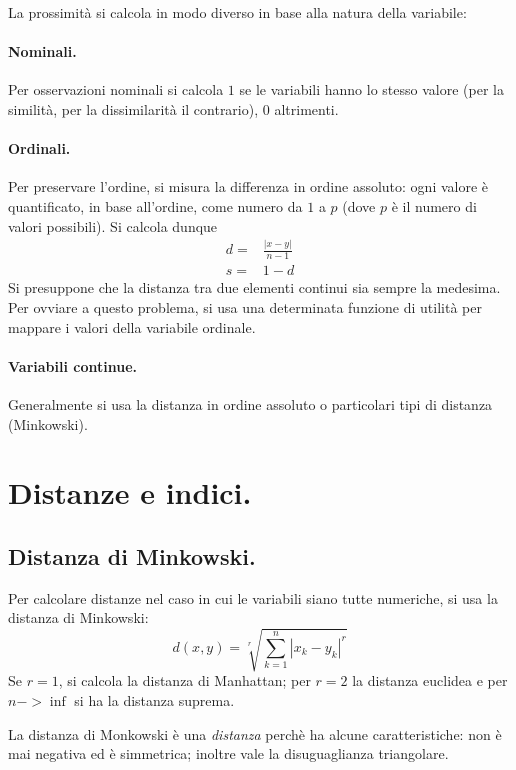 \documentclass[11pt, a4page, twocolumn]{article}
\begin{document}
La prossimità si calcola in modo diverso in base alla natura della variabile:

\paragraph{Nominali.}
Per osservazioni nominali si calcola $1$ se le variabili hanno lo stesso valore (per la similità, per la dissimilarità il contrario), $0$ altrimenti.

\paragraph{Ordinali.}
Per preservare l'ordine, si misura la differenza in ordine assoluto: ogni valore è quantificato, in base all'ordine, come numero da $1$ a $p$ (dove $p$ è il numero di valori possibili).
Si calcola dunque
\begin{align*}
d =& \frac{{|x - y|}}{n - 1} \\
s =& 1 - d
\end{align*}
Si presuppone che la distanza tra due elementi continui sia sempre la medesima.
Per ovviare a questo problema, si usa una determinata funzione di utilità per mappare i valori della variabile ordinale.

\paragraph{Variabili continue.}
Generalmente si usa la distanza in ordine assoluto o particolari tipi di distanza (Minkowski).

\section{Distanze e indici.}
\subsection{Distanza di Minkowski.}
Per calcolare distanze nel caso in cui le variabili siano tutte numeriche, si usa la distanza di Minkowski:
\begin{equation*}
d(x, y) = \sqrt[r]{\sum^{n}_{k=1}{|x_k - y_k|^r}}
\end{equation*}
Se $r = 1$, si calcola la distanza di Manhattan; per $r = 2$ la distanza euclidea e per $n -> \inf$ si ha la distanza suprema.

La distanza di Monkowski è una \textit{distanza} perchè ha alcune caratteristiche: non è mai negativa ed è simmetrica; inoltre vale la disuguaglianza triangolare.
\end{document}
